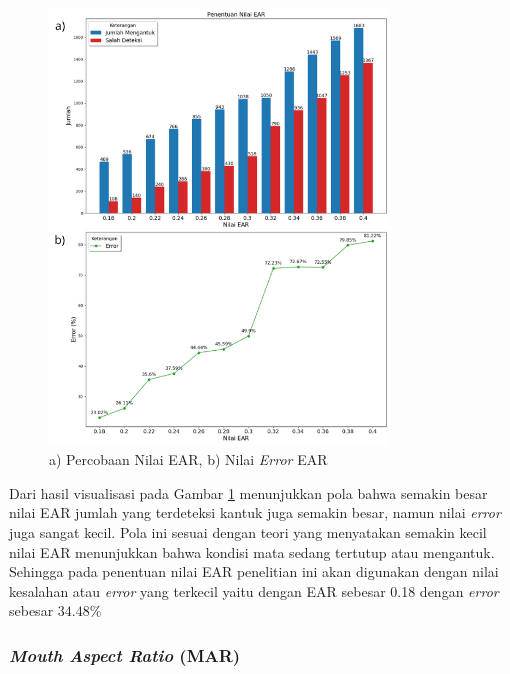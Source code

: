             \begin{figure}[H]
             \centering
                 \includegraphics[width=0.8\textwidth]{figures/bab4/penentuan nilai ear.png}
                 \caption{a) Percobaan Nilai EAR, b) Nilai \textit{Error} EAR}
                 \label{Eksperimen Penentuan Nilai EAR}
             \end{figure}


          Dari hasil visualisasi pada Gambar \ref{Eksperimen Penentuan Nilai EAR} menunjukkan pola bahwa semakin besar nilai EAR jumlah yang terdeteksi kantuk juga semakin besar, namun nilai \textit{error }juga sangat kecil. Pola ini sesuai dengan teori yang menyatakan semakin kecil nilai EAR menunjukkan bahwa kondisi mata sedang tertutup atau mengantuk. Sehingga pada penentuan nilai EAR penelitian ini akan digunakan dengan nilai kesalahan atau \textit{error} yang terkecil yaitu dengan EAR sebesar 0.18 dengan \textit{error} sebesar $34.48\%$\\

    

\subsubsection{\textit{Mouth Aspect Ratio} (MAR)}
    
